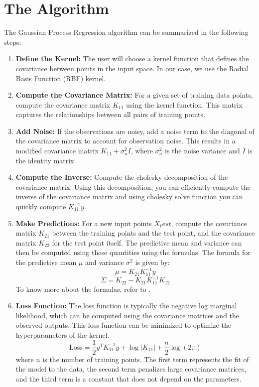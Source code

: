 \documentclass{article}
\begin{document}
\section{The Algorithm}
\label{sec:algorithm}
The Gaussian Process Regression algorithm can be summarized in the following steps:
\begin{enumerate}
\item \textbf{Define the Kernel:} The user will choose a kernel function that defines the covariance between points in the input space. In our case, we use the Radial Basis Function (RBF) kernel.
\item \textbf{Compute the Covariance Matrix:} For a given set of training data points, compute the covariance matrix \( K_{11} \) using the kernel function. This matrix captures the relationships between all pairs of training points.   
\item \textbf{Add Noise:} If the observations are noisy, add a noise term to the diagonal of the covariance matrix to account for observation noise. This results in a modified covariance matrix \( K_{11} + \sigma_n^2 I \), where \( \sigma_n^2 \) is the noise variance and \( I \) is the identity matrix.
\item \textbf{Compute the Inverse:} Compute the cholesky decomposition of the covariance matrix. Using this decomposition, you can efficiently compute the inverse of the covariance matrix and using cholesky solve function you can quickly compute $K_{11}^{-1} y$.
\item \textbf{Make Predictions:} For a new input points \( X_test \), compute the covariance matrix \( K_{21} \) between the training points and the test point, and the covariance matrix \( K_{22} \) for the test point itself. The predictive mean and variance can then be computed using these quantities using the formulas. The formula for the predictive mean \( \mu \) and variance \( \sigma^2 \) is given by:
\begin{equation}
\mu = K_{21} K_{11}^{-1} y
\end{equation} 
\begin{equation}
\Sigma = K_{22} - K_{21} K_{11}^{-1} K_{12}
\end{equation}
To know more about the formulas, refer to \cite{peterroelants}.
\item \textbf{Loss Function:} The loss function is typically the negative log marginal likelihood, which can be computed using the covariance matrices and the observed outputs. This loss function can be minimized to optimize the hyperparameters of the kernel.
\begin{equation}
\text{Loss} = \frac{1}{2} y^T K_{11}^{-1} y + \log |K_{11}| + \frac{n}{2} \log(2\pi)
\end{equation}
where \( n \) is the number of training points. The first term represents the fit of the model to the data, the second term penalizes large covariance matrices, and the third term is a constant that does not depend on the parameters.
\end{enumerate}
\end{document}

